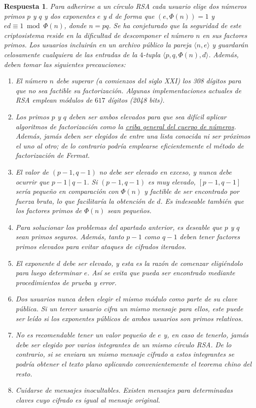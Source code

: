 \documentclass[
  a4paper,
  spanish,
  12pt,
]{scrartcl}
\theoremstyle{ejercicio-style}
\theoremstyle{remark-style}
\newtheorem*{sol}{Respuesta}
\theoremstyle{teorema-style}
\begin{document}
\begin{sol}
  Para adherirse a un círculo RSA cada usuario elige dos números primos $p$ y $q$ y dos exponentes $e$ y $d$ de forma que $(e, \Phi(n)) = 1$ y $ed \equiv 1 \bmod \Phi(n)$, donde $n=pq$. Se ha conjeturado que la seguridad de este criptosistema reside en la dificultad de descomponer el número $n$ en sus factores primos. Los usuarios incluirán en un archivo público la pareja $\langle n, e\rangle$ y guardarán celosamente cualquiera de las entradas de la $4$-tupla $\langle p, q, \Phi(n), d \rangle$. Además, deben tomar las siguientes precauciones:
  \begin{enumerate}
    \item El número $n$ debe superar (a comienzos del siglo XXI) los 308 dígitos para que no sea factible su factorización. Algunas implementaciones actuales de RSA emplean módulos de $617$ dígitos (2048 bits).
    \item Los primos $p$ y $q$ deben ser ambos elevados para que sea difícil aplicar algoritmos de factorización como la \href{https://en.wikipedia.org/wiki/General_number_field_sieve}{criba general del cuerpo de números}. Además, jamás deben ser elegidos de entre una lista conocida ni ser próximos el uno al otro; de lo contrario podría emplearse eficientemente el método de factorización de Fermat.
    \item El valor de $(p-1, q-1)$ no debe ser elevado en exceso, y nunca debe ocurrir que $p-1 \ | \ q-1$. Si $(p-1, q-1)$ es muy elevado, $[p-1, q-1]$ sería pequeño en comparación con $\Phi(n)$ y factible de ser encontrado por fuerza bruta, lo que facilitaría la obtención de $d$. Es indeseable también que los factores primos de $\Phi(n)$ sean pequeños.
    \item Para solucionar los problemas del apartado anterior, es deseable que $p$ y $q$ sean \textit{primos seguros}. Además, tanto $p-1$ como $q-1$ deben tener factores primos elevados para evitar ataques de cifrados iterados.
    \item El exponente $d$ debe ser elevado, y esta es la razón de comenzar eligiéndolo para luego determinar $e$. Así se evita que pueda ser encontrado mediante procedimientos de prueba y error.
    \item Dos usuarios nunca deben elegir el mismo módulo como parte de su clave pública. Si un tercer usuario cifra un mismo mensaje para ellos, este puede ser leído si los exponentes públicos de ambos usuarios son primos relativos.
    \item No es recomendable tener un valor pequeño de $e$ y, en caso de tenerlo, jamás debe ser elegido por varios integrantes de un mismo círculo RSA. De lo contrario, si se enviara un mismo mensaje cifrado a estos integrantes se podría obtener el texto plano aplicando convenientemente el \textit{teorema chino del resto}.
    \item Cuidarse de mensajes inocultables. Existen mensajes para determinadas claves cuyo cifrado es igual al mensaje original.
  \end{enumerate}
\end{sol}
\end{document}
